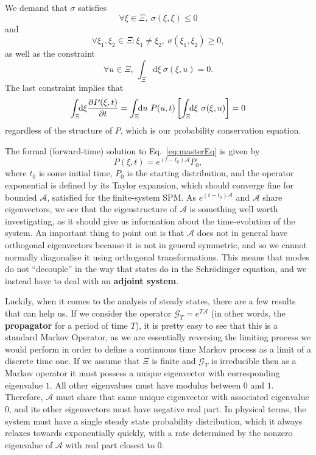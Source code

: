 We demand that $\sigma$ satisfies
\begin{equation}
 \forall \xi \in \Xi, \ \sigma (\xi , \xi) \le 0 
\end{equation}
and
\begin{equation}
 \forall \xi_1 , \xi_2 \in \Xi : \xi_1 \ne \xi_2 , \ \sigma (\xi_1 , \xi_2) \ge 0 ,
\end{equation}
as well as the constraint
\begin{equation}
 \forall u \in \Xi , \ \int_\Xi \! \! \mathrm{d}  \xi \ \sigma (\xi, u) = 0.
\end{equation}
The last constraint implies that
\begin{equation}
 \int_\Xi \! \! \mathrm{d}  \xi \frac{\partial P(\xi, t)}{\partial t} = \int_\Xi \! \! \mathrm{d}  u \ P(u, t) \left[ \int_\Xi \! \! \mathrm{d}  \xi \ \sigma (\xi, u) \right] = 0
\end{equation}
regardless of the structure of $P$, which is our probability conservation equation.

The formal (forward-time) solution to Eq.~\ref{eq:masterEq} is given by
\begin{equation} \label{eqn:formalSoln}
 P(\xi, t) = e^{(t-t_0)\mathcal{A}}P_0,
\end{equation}
where $t_0$ is some initial time, $P_0$ is the starting distribution, and the operator
exponential is defined by its Taylor expansion, which should converge fine for bounded
$\mathcal{A}$, satisfied for the finite-system SPM. As 
$e^{(t-t_0)\mathcal{A}}$ and $\mathcal{A}$ share eigenvectors, we see that the
eigenstructure of $\mathcal{A}$ is something well worth investigating, as it should
give us information about the time-evolution of the system. An important thing to point
out is that $\mathcal{A}$ does not in general have orthogonal eigenvectors because it is
not in general symmetric,
and so we cannot normally diagonalise it using orthogonal transformations. This means that modes do not ``decouple'' in the way that states do in the 
Schr\"{o}dinger equation, and we instead have to deal with an \textbf{adjoint system}.

Luckily, when it comes to the analysis of steady states, there are a few results that
can help us. If we consider the operator $\mathcal{G}_T = e^{T\mathcal{A}}$ (in other words, the 
\textbf{propagator} for a period of time $T$), it is pretty easy to see that this is
a standard Markov Operator, as we are essentially reversing the limiting process
we would perform in order to define a continuous time Markov process as a limit of
a discrete time one. If we assume that $\Xi$ is finite and $\mathcal{G}_T$ is irreducible then as
a Markov operator it must possess  a unique eigenvector with corresponding eigenvalue $1$.
All other eigenvalues must have modulus between $0$ and $1$. Therefore, $\mathcal{A}$
must share that same unique eigenvector with associated eigenvalue $0$, and its other
eigenvectors must have negative real part. In physical terms, the system must have a single
steady state probability distribution, which it always relaxes towards exponentially
quickly, with a rate determined by the nonzero eigenvalue of $\mathcal{A}$ with real
part closest to $0$.

